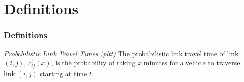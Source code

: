 \documentclass[t]{beamer}
\begin{document}
\section{Definitions}

\begin{frame}\frametitle{Definitions}
\vspace{-0.25in}
\begin{block}{\textit{Probabilistic Link Travel Times \textit{(pltt)}}}
The probabilistic link travel time of link $(i,j)$, $c_{ij}^t(x)$, is the probability of taking $x$ minutes for a vehicle to traverse link $(i,j)$ starting at time $t$.
\end{block}
\vspace{-0.1in}
\end{frame}
\end{document}
